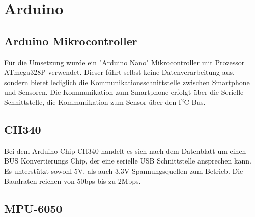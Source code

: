 \section{Arduino}

\subsection*{Arduino Mikrocontroller}
Für die Umsetzung wurde ein "Arduino Nano" Mikrocontroller mit Prozessor ATmega328P verwendet. Dieser führt selbst keine Datenverarbeitung aus, sondern bietet lediglich die Kommunikationsschnittstelle zwischen Smartphone und Sensoren. Die Kommunikation zum Smartphone erfolgt über die Serielle Schnittstelle, die Kommunikation zum Sensor über den I$^2$C-Bus. 


\subsection*{CH340}
Bei dem Arduino Chip CH340 handelt es sich nach dem Datenblatt \cite{CH340} um einen BUS Konvertierungs Chip, der eine serielle USB Schnittstelle ansprechen kann.
Es unterstützt sowohl 5V, als auch 3.3V Spannungsquellen zum Betrieb.
Die Baudraten reichen von 50bps bis zu 2Mbps.


\subsection*{MPU-6050}
